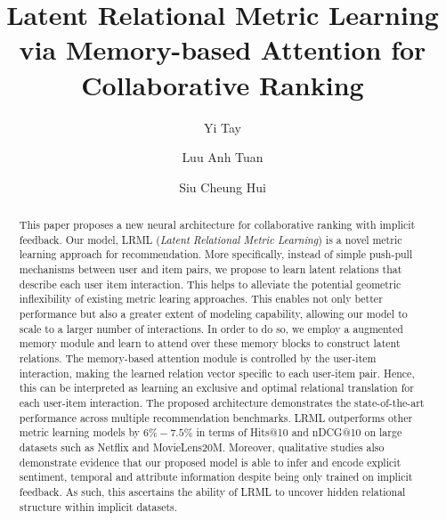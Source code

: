 \documentclass[sigconf]{acmart}
\begin{document}
\acmPrice{}

\title{Latent Relational Metric Learning via Memory-based Attention for Collaborative Ranking} 


\author{Yi Tay}

\author{Luu Anh Tuan}


\author{Siu Cheung Hui}


\begin{abstract}
This paper proposes a new neural architecture for collaborative ranking with implicit feedback. Our model, LRML (\textit{Latent Relational Metric Learning}) is a novel metric learning approach for recommendation. More specifically, instead of simple push-pull mechanisms between user and item pairs, we propose to learn latent relations that describe each user item interaction. This helps to alleviate the potential geometric inflexibility of existing metric learing approaches. This enables not only better performance but also a greater extent of modeling capability, allowing our model to scale to a larger number of interactions. In order to do so, we employ a augmented memory module and learn to attend over these memory blocks to construct latent relations. The memory-based attention module is controlled by the user-item interaction, making the learned relation vector specific to each user-item pair. Hence, this can be interpreted as learning an exclusive and optimal relational translation for each user-item interaction. The proposed architecture demonstrates the state-of-the-art performance across multiple recommendation benchmarks. LRML outperforms other metric learning models by $6\%-7.5\%$ in terms of Hits@10 and nDCG@10 on large datasets such as Netflix and MovieLens20M. Moreover, qualitative studies also demonstrate evidence that our proposed model is able to infer and encode explicit sentiment, temporal and attribute information despite being only trained on implicit feedback. As such, this ascertains the ability of LRML to uncover hidden relational structure within implicit datasets. 

\end{abstract}
\end{document}
